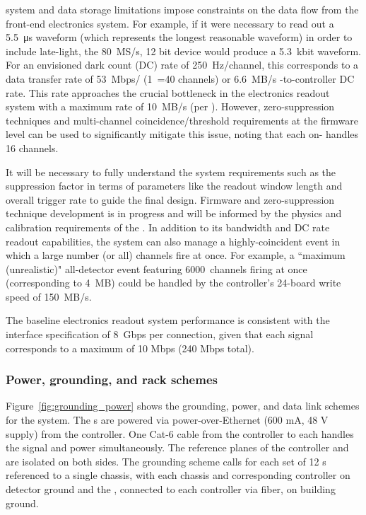 system and data storage limitations impose constraints on the  data flow from the front-end electronics system. 
For example, if it were necessary to read out a \SI{5.5}{\micro\second} waveform (which represents the longest reasonable waveform) 
in order to include late-light, the \SI{80}{MS/s}, 12 bit  device would produce a 5.3~kbit waveform. For an envisioned dark count (DC) rate of 250~Hz/channel, this corresponds to a data transfer rate of 53~Mbps/ (1~=40 channels) or 6.6~MB/s -to-controller DC rate. This rate approaches the crucial bottleneck in the electronics readout system with a maximum rate of 10~MB/s  %
(per ). However, zero-suppression techniques and multi-channel coincidence/threshold requirements at the  firmware level can be used to significantly mitigate this issue, noting that each on-  handles 16 channels. 

It will be necessary to fully understand the system requirements such as the suppression factor in terms of parameters like the readout window length and overall trigger rate to guide the final design. 
Firmware and zero-suppression technique development is in progress and will be informed by the physics and calibration requirements of the . 
In addition to its bandwidth and DC rate readout capabilities, the system can also  manage a highly-coincident event in which a large number (or all) channels fire at once. For example, a ``maximum (unrealistic)" all-detector event featuring 6000~channels firing at once (corresponding to 4~MB) could be handled by the controller's 24-board write speed of 150~MB/s. 

The baseline electronics readout system performance is consistent with the  interface specification of 8~Gbps per connection, given that %
each  signal corresponds to a maximum of 10 Mbps (240 Mbps total).  

\subsubsection{Power, grounding, and rack schemes} 

Figure~\ref{fig:grounding_power} shows the grounding, power, and data link schemes for the system. The s are powered via power-over-Ethernet (600 mA, 48 V supply) from the controller. One Cat-6 cable from the controller to each  handles the signal and power simultaneously. The reference planes of the controller and  are isolated on both sides. The grounding scheme calls for each set of 12 s referenced to a single chassis, with each chassis and corresponding controller on detector ground and the , connected to each controller via fiber, on building ground. 
 
